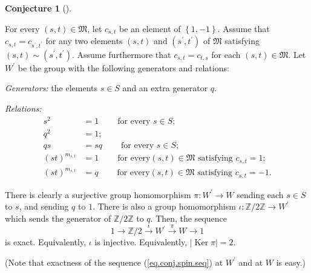 \documentclass
[numbers=enddot,12pt,final,onecolumn,notitlepage,abstracton]{scrartcl}%
\theoremstyle{definition}
\newtheorem{conj}[theo]{Conjecture}
\newenvironment{conjecture}[1][]
{\begin{conj}[#1]\begin{leftbar}}
{\end{leftbar}\end{conj}}
\begin{document}
\begin{conjecture}
\label{conj.spin}For every $\left(  s,t\right)  \in\mathfrak{M}$, let
$c_{s,t}$ be an element of $\left\{  1,-1\right\}  $. Assume that
$c_{s,t}=c_{s^{\prime},t^{\prime}}$ for any two elements $\left(  s,t\right)
$ and $\left(  s^{\prime},t^{\prime}\right)  $ of $\mathfrak{M}$ satisfying
$\left(  s,t\right)  \sim\left(  s^{\prime},t^{\prime}\right)  $. Assume
furthermore that $c_{s,t}=c_{t,s}$ for each $\left(  s,t\right)
\in\mathfrak{M}$. Let $W^{\prime}$ be the group with the following generators
and relations:

\textit{Generators:} the elements $s\in S$ and an extra generator $q$.

\textit{Relations:}%
\begin{align*}
s^{2}  &  =1\ \ \ \ \ \ \ \ \ \ \text{for every }s\in S;\\
q^{2}  &  =1;\\
qs  &  =sq\ \ \ \ \ \ \ \ \ \ \text{for every }s\in S;\\
\left(  st\right)  ^{m_{s,t}}  &  =1\ \ \ \ \ \ \ \ \ \ \text{for every
}\left(  s,t\right)  \in\mathfrak{M}\text{ satisfying }c_{s,t}=1;\\
\left(  st\right)  ^{m_{s,t}}  &  =q\ \ \ \ \ \ \ \ \ \ \text{for every
}\left(  s,t\right)  \in\mathfrak{M}\text{ satisfying }c_{s,t}=-1.
\end{align*}


There is clearly a surjective group homomorphism $\pi:W^{\prime}\rightarrow W$
sending each $s\in S$ to $s$, and sending $q$ to $1$. There is also a group
homomorphism $\iota:\mathbb{Z}/2\mathbb{Z}\rightarrow W^{\prime}$ which sends
the generator of $\mathbb{Z}/2\mathbb{Z}$ to $q$. Then, the sequence%
\begin{equation}
1\longrightarrow\mathbb{Z}/2\overset{\iota}{\longrightarrow}W^{\prime
}\overset{\pi}{\longrightarrow}W\longrightarrow1\label{eq.conj.spin.seq}%
\end{equation}
is exact. Equivalently, $\iota$ is injective. Equivalently, $\left\vert
\operatorname*{Ker}\pi\right\vert =2$.
\end{conjecture}

(Note that exactness of the sequence (\ref{eq.conj.spin.seq}) at $W^{\prime}$
and at $W$ is easy.)
\end{document}
